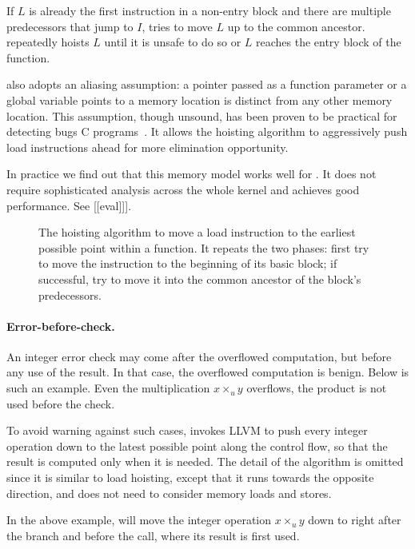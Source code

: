 If $L$ is already the first instruction in a non-entry block and
there are multiple predecessors that jump to $I$, \sys tries to
move $L$ up to the common ancestor.  \sys repeatedly hoists $L$
until it is unsafe to do so or $L$ reaches the entry block of the
function.

\sys also adopts an aliasing assumption: a pointer passed as a
function parameter or a global variable points to a memory location
is distinct from any other memory location.  This assumption, though
unsound, has been proven to be practical for detecting bugs C
programs~\cite{livshits:ipssa}.  It allows the hoisting algorithm
to aggressively push load instructions ahead for more elimination
opportunity.

In practice we find out that this memory model works well for \sys.
It does not require sophisticated analysis across the whole kernel
and achieves good performance.  See [[eval]]].

\begin{figure}

\caption{The hoisting algorithm to move a load instruction to the
earliest possible point within a function.  It repeats the two
phases: first try to move the instruction to the beginning of its
basic block; if successful, try to move it into the common ancestor
of the block's predecessors.}
\label{f:hoist}
\end{figure}
\fi

\paragraph{Error-before-check.}
An integer error check may come after the overflowed computation,
but before any use of the result.  In that case, the overflowed
computation is benign.  Below is such an example.  Even the
multiplication $x \times_u y$ overflows, the product  is
not used before the check.


To avoid warning against such cases, \sys invokes LLVM to push every
integer operation down to the latest possible point along the control
flow, so that the result is computed only when it is needed.  The
detail of the algorithm is omitted since it is similar to load
hoisting, except that it runs towards the opposite direction, and
does not need to consider memory loads and stores.

In the above example, \sys will move the integer operation $x
\times_u y$ down to right after the  branch and before the
 call, where its result  is first used.

